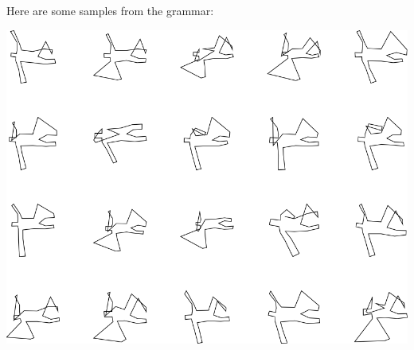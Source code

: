 Here are some samples from the grammar:

\includegraphics[width=6in]{output/3.learning/incremental/gram.15.d/samples.png}

